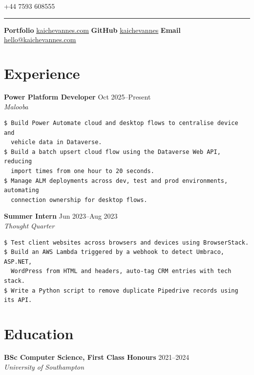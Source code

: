 \documentclass[a4paper,12pt]{article}
\newcommand{\link}[2]{\href{#1}{\ul{#2}}}
\begin{document}
{
  \setlength{\parfillskip}{0pt}
  \hspace*{-0.03em}
  \hfill+44 7593 608555\hspace*{-0.02em}\par
}
\vspace{0.3em}
\hrule
\vspace{0.5em}

\noindent
\textbf{Portfolio} \link{https://kaichevannes.com}{kaichevannes.com}
\hspace{0.2em}{\Large{$\cdot$}}\hspace{0.2em}
\textbf{GitHub} \link{https://github.com/kaichevannes}{kaichevannes}
\hspace{0.2em}{\Large{$\cdot$}}\hspace{0.2em}
\textbf{Email} \link{mailto:hello@kaichevannes.com}{hello@kaichevannes.com}

\section*{\hspace*{-0.01em}Experience}
\textbf{Power Platform Developer} \hfill Oct 2025--Present \\
\hspace*{-0.02em}\textit{Malooba}
\begin{verbatim}
$ Build Power Automate cloud and desktop flows to centralise device and
  vehicle data in Dataverse.
$ Build a batch upsert cloud flow using the Dataverse Web API, reducing
  import times from one hour to 20 seconds.
$ Manage ALM deployments across dev, test and prod environments, automating
  connection ownership for desktop flows.
\end{verbatim}

\hspace*{-0.01em}\textbf{Summer Intern} \hfill Jun 2023--Aug 2023\\
\hspace*{-0.12em}\textit{Thought Quarter}
\begin{verbatim}
$ Test client websites across browsers and devices using BrowserStack.
$ Build an AWS Lambda triggered by a webhook to detect Umbraco, ASP.NET,
  WordPress from HTML and headers, auto-tag CRM entries with tech stack.
$ Write a Python script to remove duplicate Pipedrive records using its API.
\end{verbatim}

\section*{\hspace*{-0.01em}Education}
\textbf{BSc Computer Science, First Class Honours} \hfill 2021--2024 \\
\hspace*{-0.16em}\textit{University of Southampton} \\
\end{document}
